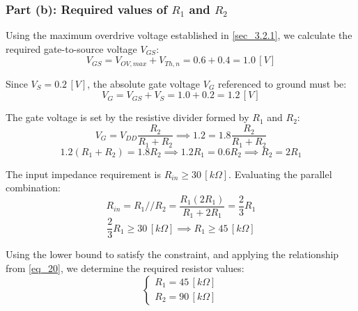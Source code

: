 \documentclass[12pt,a4paper]{article}
\begin{document}
\subsubsection{Part (b): Required values of $R_{1}$ and $R_{2}$}    \label{sec_3.2.2}        
Using the maximum overdrive voltage established in \autoref{sec_3.2.1}, we calculate the required gate-to-source voltage $V_{GS}$:
\begin{equation}
    V_{GS} = V_{OV,max} + V_{Th,n} = 0.6 + 0.4 = 1.0 \, [V]
    \label{eq_17}
\end{equation}

Since $V_{S} = 0.2 \, [V]$, the absolute gate voltage $V_{G}$ referenced to ground must be:
\begin{equation}
    V_{G} = V_{GS} + V_{S} = 1.0 + 0.2 = 1.2 \, [V]
    \label{eq_18}
\end{equation}

The gate voltage is set by the resistive divider formed by $R_{1}$ and $R_{2}$:
\begin{equation}
    V_{G} = V_{DD} \frac{R_{2}}{R_{1} + R_{2}} \implies 1.2 = 1.8 \frac{R_{2}}{R_{1} + R_{2}}
    \label{eq_19}
\end{equation}
\begin{equation}
    1.2(R_{1} + R_{2}) = 1.8 R_{2} \implies 1.2 R_{1} = 0.6 R_{2} \implies R_{2} = 2 R_{1}
    \label{eq_20}
\end{equation}

The input impedance requirement is $R_{in} \ge 30 \, [k\Omega]$. Evaluating the parallel combination:
\begin{equation}
    R_{in} = R_{1}//R_{2} = \frac{R_{1} (2 R_{1})}{R_{1} + 2 R_{1}} = \frac{2}{3} R_{1}
    \label{eq_21}
\end{equation}
\begin{equation}
    \frac{2}{3} R_{1} \ge 30 \, [k\Omega] \implies R_{1} \ge 45 \, [k\Omega]
    \label{eq_22}
\end{equation}

Using the lower bound to satisfy the constraint, and applying the relationship from \autoref{eq_20}, we determine the required resistor values:
\begin{equation}
    \begin{cases}
        R_{1} = 45 \, [k\Omega] \\
        R_{2} = 90 \, [k\Omega]
    \end{cases}
    \label{eq_23}
\end{equation}
\end{document}
